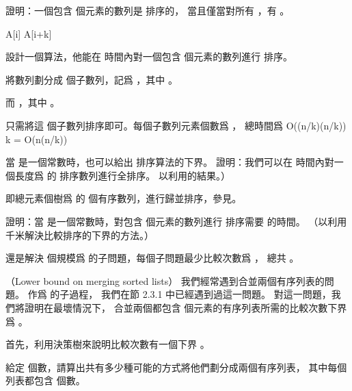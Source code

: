 \startitem
證明：一個包含  個元素的數列是  排序的，
當且僅當對所有 ，有 。
\stopitem

\startANSWER
\startformula\startmathalignment[n=1]
\NC {} \le {} \NR
\NC \Updownarrow \NR
\NC {} \le
      \NR
\NC \Updownarrow \NR
\NC {} \le {} \NR
\NC \Updownarrow \NR
\NC A[i] \le A[i+k] \NR
\stopmathalignment\stopformula
\stopANSWER

\startitem
設計一個算法，他能在  時間內對一個包含  個元素的數列進行  排序。
\stopitem

\startANSWER
將數列劃分成  個子數列，記爲 ，其中 。

而 ，其中 。

只需將這  個子數列排序即可。每個子數列元素個數爲 ，
總時間爲
\startformula
O((n/k)\lg(n/k)) \times k = O(n\lg(n/k))
\stopformula
\stopANSWER
\stopigBase

當  是一個常數時，也可以給出  排序算法的下界。
\startigBase[a,continue]
\startitem
證明：我們可以在  時間內對一個長度爲  的  排序數列進行全排序。
\hint 以利用\inexercise[k_merge] 的結果。）
\stopitem

\startANSWER
即總元素個樹爲  的  個有序數列，進行歸並排序，參見\inexercise[k_merge]。
\stopANSWER

\startitem
證明：當  是一個常數時，對包含  個元素的數列進行  排序需要  的時間。
（\hint 以利用千米解決比較排序的下界的方法。）
\stopitem

\startANSWER
還是解決  個規模爲  的子問題，每個子問題最少比較次數爲 ，
總共 。
\stopANSWER
\stopigBase
\stopPROBLEM

\startPROBLEM
（Lower bound on merging sorted lists）
我們經常遇到合並兩個有序列表的問題。
作爲  的子過程，
我們在節 2.3.1 中已經遇到過這一問題。
對這一問題，我們將證明在最壞情況下，
合並兩個都包含  個元素的有序列表所需的比較次數下界爲 。

首先，利用決策樹來說明比較次數有一個下界 。

\startigBase[a]
\startitem
給定  個數，請算出共有多少種可能的方式將他們劃分成兩個有序列表，
其中每個列表都包含  個數。
\stopitem

